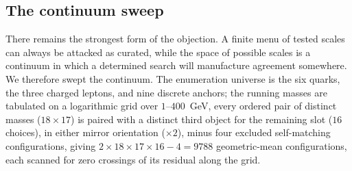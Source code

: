 \documentclass[aps,twocolumn,superscriptaddress,nofootinbib,floatfix]{revtex4-2}
\begin{document}
\subsection{The continuum sweep}
\label{sec:sweep}

There remains the strongest form of the objection. A finite menu of tested scales can always be attacked as curated, while the space of possible scales is a continuum in which a determined search will manufacture agreement somewhere. We therefore swept the continuum. The enumeration universe is the six quarks, the three charged leptons, and nine discrete anchors; the running masses are tabulated on a logarithmic grid over $1$--$400$~GeV, every ordered pair of distinct masses ($18\times17$) is paired with a distinct third object for the remaining slot ($16$ choices), in either mirror orientation ($\times2$), minus four excluded self-matching configurations, giving $2\times18\times17\times16-4=9788$ geometric-mean configurations, each scanned for zero crossings of its residual along the grid.
\end{document}
